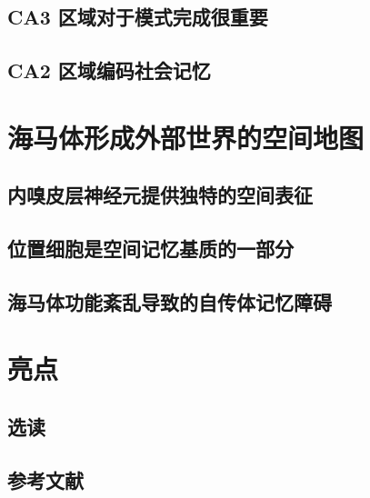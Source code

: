 \subsection{CA3 区域对于模式完成很重要}
\subsection{CA2 区域编码社会记忆}

\section{海马体形成外部世界的空间地图}
\subsection{内嗅皮层神经元提供独特的空间表征}
\subsection{位置细胞是空间记忆基质的一部分}
\subsection{海马体功能紊乱导致的自传体记忆障碍}

\section{亮点}
\subsection{选读}
\subsection{参考文献}


